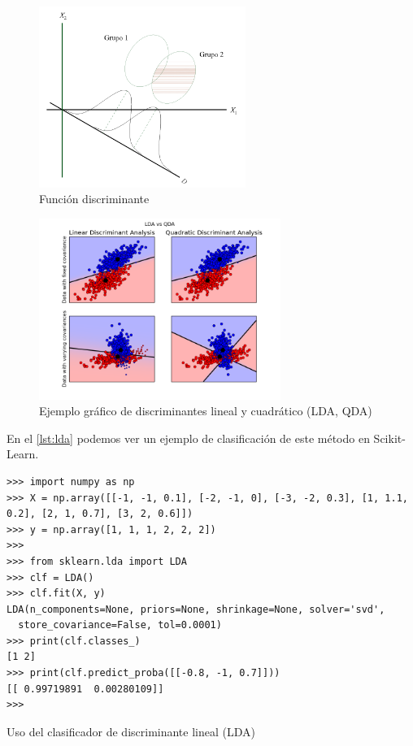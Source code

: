 \begin{figure}[htbp]
\centering
\includegraphics[width=0.6\textwidth]{lda}
\caption[Función discriminante]{Función discriminante \citep{Ruiz2001}}
\label{fig:lda}
\end{figure}

\begin{figure}[htbp]
\centering
\includegraphics[width=0.7\textwidth]{plot_lda_qda_0011}
\caption[Ejemplo gráfico de discriminantes lineal y cuadrático (LDA, QDA)]{Ejemplo gráfico de discriminantes lineal y cuadrático (LDA, QDA) \citep{Pedregosa2011}}
\label{fig:lda-qda}
\end{figure}

En el \autoref{lst:lda} podemos ver un ejemplo de clasificación de este método en Scikit-Learn.

\begin{listing}[htbp]
\begin{verbatim}
>>> import numpy as np
>>> X = np.array([[-1, -1, 0.1], [-2, -1, 0], [-3, -2, 0.3], [1, 1.1, 0.2], [2, 1, 0.7], [3, 2, 0.6]])
>>> y = np.array([1, 1, 1, 2, 2, 2])
>>> 
>>> from sklearn.lda import LDA
>>> clf = LDA()
>>> clf.fit(X, y)
LDA(n_components=None, priors=None, shrinkage=None, solver='svd',
  store_covariance=False, tol=0.0001)
>>> print(clf.classes_)
[1 2]
>>> print(clf.predict_proba([[-0.8, -1, 0.7]]))
[[ 0.99719891  0.00280109]]
>>> 
\end{verbatim}
\caption{Uso del clasificador de discriminante lineal (LDA)}
\label{lst:lda}
\end{listing}



